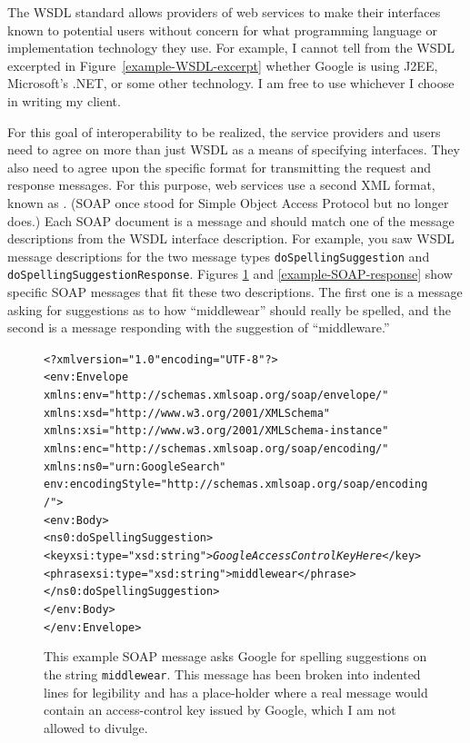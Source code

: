The WSDL standard allows providers of web services to make their
interfaces known to potential users without concern for what
programming language or implementation technology they use.  For
example, I cannot tell from the WSDL excerpted in
Figure~\ref{example-WSDL-excerpt} whether Google is using
J2EE, Microsoft's .NET, or some other technology.  I am free to use
whichever I choose in writing my client.

For this goal of interoperability to be realized, the service
providers and users need to agree on more than just WSDL as a means of
specifying interfaces.  They also need to agree upon the specific
format for transmitting the request and response messages.  For this
purpose, web services use a second XML format, known as .
(SOAP once stood for Simple Object Access Protocol but no longer does.)
Each SOAP document is a
message and should match one of the message descriptions from the
WSDL interface description.  For example, you saw WSDL message
descriptions for the two message types \verb|doSpellingSuggestion| and
\verb|doSpellingSuggestionResponse|.  Figures
\ref{example-SOAP-request} and \ref{example-SOAP-response} show
specific SOAP messages that fit these two descriptions.  The first one
is a message asking for suggestions as to how ``middlewear'' should
really be spelled, and the second is a message responding with the
suggestion of ``middleware.''
\begin{figure}
\begin{alltt}
<?xml version="1.0" encoding="UTF-8"?>
<env:Envelope
 xmlns:env="http://schemas.xmlsoap.org/soap/envelope/"
 xmlns:xsd="http://www.w3.org/2001/XMLSchema"
 xmlns:xsi="http://www.w3.org/2001/XMLSchema-instance"
 xmlns:enc="http://schemas.xmlsoap.org/soap/encoding/"
 xmlns:ns0="urn:GoogleSearch"
 env:encodingStyle="http://schemas.xmlsoap.org/soap/encoding/">
  <env:Body>
    <ns0:doSpellingSuggestion>
      <key xsi:type="xsd:string">\textrm{\textit{GoogleAccessControlKeyHere}}</key>
      <phrase xsi:type="xsd:string">middlewear</phrase>
    </ns0:doSpellingSuggestion>
  </env:Body>
</env:Envelope>
\end{alltt}
\caption{This example SOAP message asks Google for spelling suggestions
on the string {\tt middlewear}. This message has been broken into indented lines
for legibility and has a place-holder where a real message would contain an
access-control key issued by Google, which I am not allowed to divulge.}\label{example-SOAP-request}
\end{figure}
